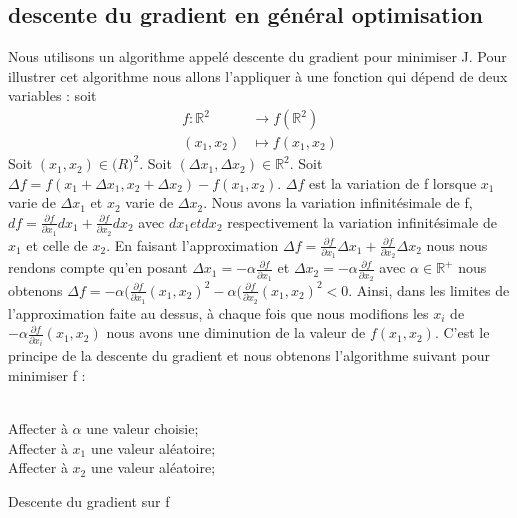 \documentclass[a4paper,10pt]{article}
\begin{document}
\subsection{descente du gradient en général optimisation}
Nous utilisons un algorithme appelé descente du gradient pour minimiser J. Pour illustrer cet algorithme nous allons l'appliquer à une fonction qui dépend de deux variables : soit
\begin{align*}
f\colon \mathbb{R}^2&\longrightarrow f(\mathbb{R}^2)\\
(x_1, x_2)&\longmapsto f(x_1, x_2)
\end{align*}
Soit $(x_1, x_2) \in \mathbb(R)^2$. Soit $(\Delta x_1, \Delta x_2) \in \mathbb{R}^2$. Soit $\Delta f = f(x_1 + \Delta x_1, x_2 + \Delta x_2) - f(x_1, x_2)$.
$\Delta f$ est la variation de f lorsque $x_1$ varie de $\Delta x_1$ et $x_2$ varie de $\Delta x_2$. Nous avons la variation infinitésimale de f, $df = \frac{\partial f}{\partial x_{1}}d x_{1} + \frac{\partial f}{\partial x_{2}}dx_{2}$ avec $dx_1 et dx_2$ respectivement la variation infinitésimale de $x_1$ et celle de $x_2$. En faisant l'approximation
 $\Delta f = \frac{\partial f}{\partial x_{1}}\Delta  x_{1} + \frac{\partial f}{\partial x_{2}}\Delta x_{2}$ nous nous rendons compte
 qu'en posant $\Delta x_{1} = -\alpha \frac{\partial f}{\partial x_{1}}$
 et $\Delta x_{2} = -\alpha \frac{\partial f}{\partial x_{2}}$ avec $\alpha \in \mathbb{R}^+$
 nous obtenons $\Delta f = -\alpha (\frac{\partial f}{\partial x_{1}}(x_1, x_2)^{2} - \alpha (\frac{\partial f}{\partial x_{2}}(x_1, x_2)^{2} < 0$. Ainsi, dans
 les limites de l'approximation faite au dessus, à chaque fois que nous modifions les $x_{i}$ de $- \alpha \frac{\partial f}{\partial x_{i}}(x_1, x_2)$
 nous avons une diminution de la valeur de $f(x_1, x_2)$. C'est le principe de la descente du gradient et nous obtenons l'algorithme suivant pour minimiser f :\\\\
\begin{algorithm}[H]
Affecter à $\alpha$ une valeur choisie;\\
Affecter à $x_1$ une valeur aléatoire;\\
Affecter à $x_2$ une valeur aléatoire;\\
\caption{Descente du gradient sur f}
\end{algorithm}
\end{document}
